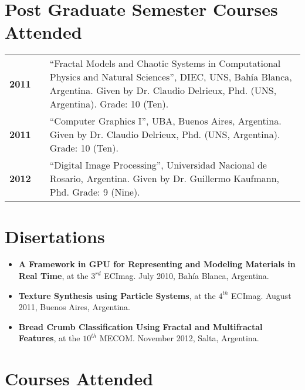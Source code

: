 \documentclass[a4paper,12pt]{article}
\begin{document}
\section*{Post Graduate Semester Courses Attended}

\begin{tabular}{lcp{12 cm}}
\bf{2011}& & \textquotedblleft Fractal Models and Chaotic Systems in Computational Physics and Natural Sciences\textquotedblright, DIEC, UNS, Bah\'ia Blanca, Argentina. Given by Dr. Claudio Delrieux, Phd. (UNS, Argentina). Grade: 10 (Ten).\\
\bf{2011}& & \textquotedblleft Computer Graphics I\textquotedblright, UBA, Buenos Aires, Argentina. Given by Dr. Claudio Delrieux, Phd. (UNS, Argentina). Grade: 10 (Ten).\\
\bf{2012}& & \textquotedblleft Digital Image Processing\textquotedblright, Universidad Nacional de Rosario, Argentina. Given by Dr. Guillermo Kaufmann, Phd. Grade: 9 (Nine).\\
\end{tabular}


\section*{Disertations}
\begin{itemize}
\item {\bf A Framework in GPU for Representing and Modeling Materials in Real Time}, at the $3^{rd}$ ECImag. July 2010, Bahía Blanca, Argentina.
\item {\bf Texture Synthesis using Particle Systems}, at the $4^{th}$ ECImag. August 2011, Buenos Aires, Argentina.
\item {\bf Bread Crumb Classification Using Fractal and Multifractal Features}, at the $10^{th}$ MECOM. November 2012, Salta, Argentina.
\end{itemize}


\section*{Courses Attended}
\end{document}

